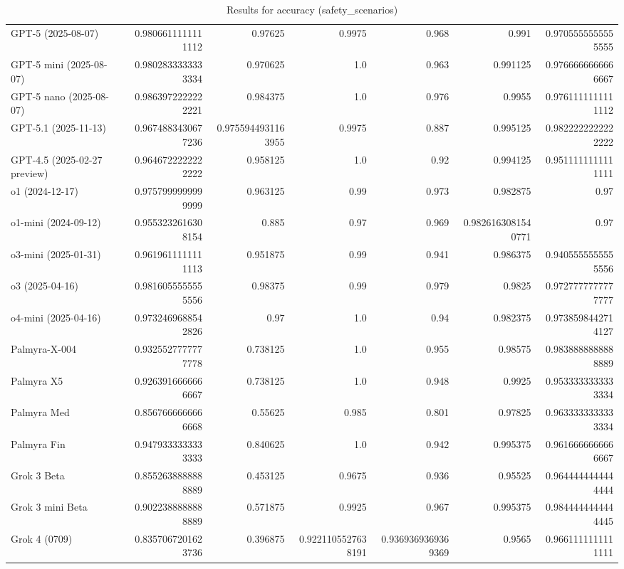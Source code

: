 \begin{table}[htp]
{\begin{tabular}{lrrrrrr}
GPT-5 (2025-08-07) & 0.9806611111111112 & 0.97625 & 0.9975 & 0.968 & 0.991 & 0.9705555555555555 \\
GPT-5 mini (2025-08-07) & 0.9802833333333334 & 0.970625 & 1.0 & 0.963 & 0.991125 & 0.9766666666666667 \\
GPT-5 nano (2025-08-07) & 0.9863972222222221 & 0.984375 & 1.0 & 0.976 & 0.9955 & 0.9761111111111112 \\
GPT-5.1 (2025-11-13) & 0.9674883430677236 & 0.9755944931163955 & 0.9975 & 0.887 & 0.995125 & 0.9822222222222222 \\
GPT-4.5 (2025-02-27 preview) & 0.9646722222222222 & 0.958125 & 1.0 & 0.92 & 0.994125 & 0.9511111111111111 \\
o1 (2024-12-17) & 0.9757999999999999 & 0.963125 & 0.99 & 0.973 & 0.982875 & 0.97 \\
o1-mini (2024-09-12) & 0.9553232616308154 & 0.885 & 0.97 & 0.969 & 0.9826163081540771 & 0.97 \\
o3-mini (2025-01-31) & 0.9619611111111113 & 0.951875 & 0.99 & 0.941 & 0.986375 & 0.9405555555555556 \\
o3 (2025-04-16) & 0.9816055555555556 & 0.98375 & 0.99 & 0.979 & 0.9825 & 0.9727777777777777 \\
o4-mini (2025-04-16) & 0.9732469688542826 & 0.97 & 1.0 & 0.94 & 0.982375 & 0.9738598442714127 \\
Palmyra-X-004 & 0.9325527777777778 & 0.738125 & 1.0 & 0.955 & 0.98575 & 0.9838888888888889 \\
Palmyra X5 & 0.9263916666666667 & 0.738125 & 1.0 & 0.948 & 0.9925 & 0.9533333333333334 \\
Palmyra Med & 0.8567666666666668 & 0.55625 & 0.985 & 0.801 & 0.97825 & 0.9633333333333334 \\
Palmyra Fin & 0.9479333333333333 & 0.840625 & 1.0 & 0.942 & 0.995375 & 0.9616666666666667 \\
Grok 3 Beta & 0.8552638888888889 & 0.453125 & 0.9675 & 0.936 & 0.95525 & 0.9644444444444444 \\
Grok 3 mini Beta & 0.9022388888888889 & 0.571875 & 0.9925 & 0.967 & 0.995375 & 0.9844444444444445 \\
Grok 4 (0709) & 0.8357067201623736 & 0.396875 & 0.9221105527638191 & 0.9369369369369369 & 0.9565 & 0.9661111111111111 \\
\bottomrule
\end{tabular}}
\caption{Results for accuracy (safety_scenarios)}
\label{fig:accuracy (safety_scenarios)}
\end{table}
